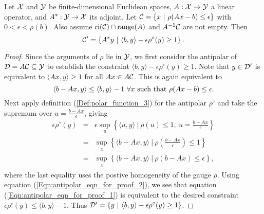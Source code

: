 \begin{prop}		\label{Prop:antipolar_of_primal_phase_retrieval}
Let ${\mathcal X}$ and ${\mathcal Y}$ be finite-dimensional Euclidean spaces, $A : {\mathcal X} \rightarrow {\mathcal Y}$ a linear operator, and $A^* : {\mathcal Y} \rightarrow {\mathcal X}$ its adjoint.  Let ${\mathcal C} = \{ x \ | \ \rho(Ax-b) \leq \epsilon \}$ with $0 < \epsilon < \rho(b)$.  Also assume $\textnormal{ri}({\mathcal C}) \cap \textnormal{range}(A)$ and $A^{-1}{\mathcal C}$ are not empty. Then
\begin{equation}			\label{Eqn:antipolar_of_primal_phase_retrieval}
{\mathcal C}' = \left\{ A^*y \ | \ \langle b, y \rangle - \epsilon \rho^\circ(y) \geq 1  \right\}.	
\end{equation}
\end{prop}
\begin{proof}
Since the arguments of $\rho$ lie in ${\mathcal Y}$, we first consider the antipolar of ${\mathcal D} = A{\mathcal C} \subseteq {\mathcal Y}$ to establish the constraint $\langle b, y \rangle - \epsilon \rho^\circ(y) \geq 1$.  Note that $y \in {\mathcal D}'$ is equivalent to $\langle Ax, y \rangle \geq 1$ for all $Ax \in A{\mathcal C}$.  This is again equivalent to
\begin{equation}				\label{Eqn:antipolar_eqn_for_proof_1}
\langle b - Ax, y \rangle \leq \langle b, y \rangle - 1 \ \forall x \ \textnormal{such that} \ \rho(Ax-b) \leq \epsilon.
\end{equation}
Next apply definition (\ref{Def:polar_function_3}) for the antipolar $\rho^\circ$ and take the supremum over $u = \frac{b-Ax}{\epsilon}$, giving 
\begin{equation}  		\label{Eqn:antipolar_eqn_for_proof_2}
\begin{array}{lll}
\epsilon \rho^\circ(y) 	&	=	&	\epsilon \sup\limits_{\substack{u}} \left\{ \langle u, y \rangle \ | \ \rho(u) \leq 1, \ u = \frac{b-Ax}{\epsilon}  \right\} 	\\
	&	= 	&  \sup\limits_{\substack{x}} \left\{ \langle b - Ax, y \rangle \ | \ \rho\left(\frac{b-Ax}{\epsilon}\right) \leq 1  \right\} \\
		&	= 	&  \sup\limits_{\substack{x}} \left\{ \langle b - Ax, y \rangle \ | \ \rho(b-Ax) \leq \epsilon  \right\},
\end{array}
\end{equation}
where the last equality uses the postive homogeneity of the gauge $\rho$.  Using equation (\ref{Eqn:antipolar_eqn_for_proof_2}), we see that equation (\ref{Eqn:antipolar_eqn_for_proof_1}) is equivalent to the desired constraint $\epsilon \rho^\circ(y) \leq  \langle b, y \rangle - 1$.  Thus ${\mathcal D}' = \{ y \ | \ \langle b, y \rangle - \epsilon \rho^\circ(y) \geq 1 \}$.


\end{proof}
